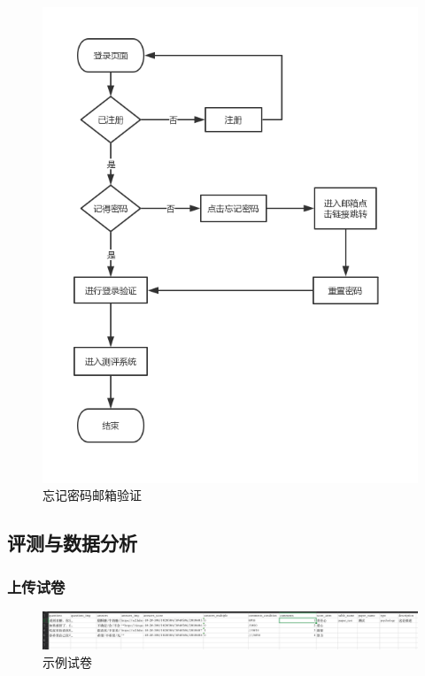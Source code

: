 \begin{figure}[thbp!]
	\centering
	\includegraphics[width=1.0\linewidth]{figure/password_mail}
	\caption{忘记密码邮箱验证}
	\label{fig:password_email}
\end{figure}

\subsection{评测与数据分析}

\subsubsection{上传试卷}

\begin{figure}[thbp!]
	\centering
	\includegraphics[width=1.0\linewidth]{figure/paper}
	\caption{示例试卷}
	\label{fig:paper}
\end{figure}

